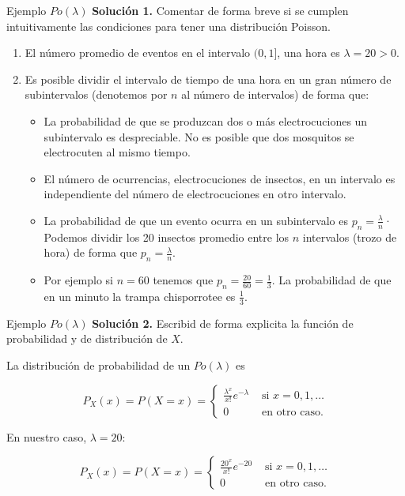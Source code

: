 \documentclass[
  ignorenonframetext,
  aspectratio=169]{beamer}
\providecommand{\tightlist}{%
  \setlength{\itemsep}{0pt}\setlength{\parskip}{0pt}}\usepackage{longtable,booktabs,array}
\begin{document}
\begin{frame}{Ejemplo \(Po(\lambda)\)}
\protect\hypertarget{ejemplo-polambda-1}{}
\textbf{Solución 1.} Comentar de forma breve si se cumplen
intuitivamente las condiciones para tener una distribución Poisson.

\begin{enumerate}
\tightlist
\item
  El número promedio de eventos en el intervalo \((0,1]\), una hora es
  \(\lambda=20>0\).
\item
  Es posible dividir el intervalo de tiempo de una hora en un gran
  número de subintervalos (denotemos por \(n\) al número de intervalos)
  de forma que:

  \begin{itemize}
  \tightlist
  \item
    La probabilidad de que se produzcan dos o más electrocuciones un
    subintervalo es despreciable. No es posible que dos mosquitos se
    electrocuten al mismo tiempo.
  \item
    El número de ocurrencias, electrocuciones de insectos, en un
    intervalo es independiente del número de electrocuciones en otro
    intervalo.
  \item
    La probabilidad de que un evento ocurra en un subintervalo es
    \(p_n=\frac{\lambda}{n}\)· Podemos dividir los 20 insectos promedio
    entre los \(n\) intervalos (trozo de hora) de forma que
    \(p_n=\frac{\lambda}{n}\).
  \item
    Por ejemplo si \(n=60\) tenemos que
    \(p_n=\frac{20}{60}=\frac{1}{3}\). La probabilidad de que en un
    minuto la trampa chisporrotee es \(\frac{1}{3}\).
  \end{itemize}
\end{enumerate}
\end{frame}

\begin{frame}{Ejemplo \(Po(\lambda)\)}
\protect\hypertarget{ejemplo-polambda-2}{}
\textbf{Solución 2.} Escribid de forma explicita la función de
probabilidad y de distribución de \(X\).

La distribución de probabilidad de un \(Po(\lambda)\) es

\[
P_X(x)=P(X=x)=\left\{\begin{array}{ll}  \frac{\lambda^x}{x!}e^{-\lambda} & \mbox{ si } x=0,1,\ldots\\ 0  & \mbox{ en otro caso.}\end{array}\right.
\]

En nuestro caso, \(\lambda =20\):

\[
P_X(x)=P(X=x)=\left\{\begin{array}{ll}\frac{20^x}{x!}e^{-20} & \mbox{ si } x=0,1,\ldots\\ 0  & \mbox{ en otro caso.}\end{array}\right.
\]
\end{frame}
\end{document}
